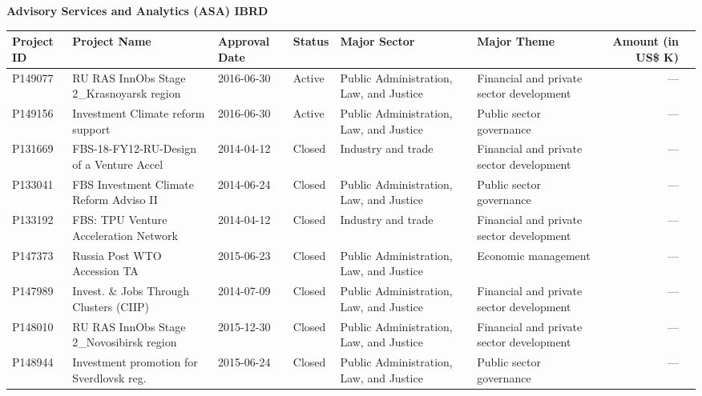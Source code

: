 \documentclass{article}\usepackage[]{graphicx}\usepackage[]{color}
\begin{document}
\begin{minipage}[b]{0.99\textwidth}
\begin{minipage}[b]{0.99\textwidth}
\begin{minipage}[c]{0.99\textwidth}
     \vspace*{0.5cm}
     \end{minipage}
     
     \begin{minipage}[c]{0.99\textwidth} %
     \raggedright{\color{white!30!blue} \textbf{\large Advisory Services and Analytics (ASA) IBRD}}
     \vspace*{0.5cm}
     
{\footnotesize
\begin{tabular}{l>{\raggedright}p{1in}ll>{\raggedright}p{1in}>{\raggedright}p{1in}rl}
 Project ID & Project Name & Approval Date & Status & Major Sector & Major Theme & Amount (in US\$ K) &  \\ 
  \hline
P149077 & RU RAS InnObs Stage 2\_Krasnoyarsk region & 2016-06-30 & Active & Public Administration, Law, and Justice & Financial and private sector development & --- &  \\ 
  P149156 & Investment Climate reform support & 2016-06-30 & Active & Public Administration, Law, and Justice & Public sector governance & --- &  \\ 
  P131669 & FBS-18-FY12-RU-Design of a Venture Accel & 2014-04-12 & Closed & Industry and trade & Financial and private sector development & --- &  \\ 
  P133041 & FBS Investment Climate Reform Adviso II & 2014-06-24 & Closed & Public Administration, Law, and Justice & Public sector governance & --- &  \\ 
  P133192 & FBS: TPU Venture Acceleration Network & 2014-04-12 & Closed & Industry and trade & Financial and private sector development & --- &  \\ 
  P147373 & Russia Post WTO Accession TA & 2015-06-23 & Closed & Public Administration, Law, and Justice & Economic management & --- &  \\ 
  P147989 & Invest. \& Jobs Through Clusters (CIIP) & 2014-07-09 & Closed & Public Administration, Law, and Justice & Financial and private sector development & --- &  \\ 
  P148010 & RU RAS InnObs Stage 2\_Novosibirsk region & 2015-12-30 & Closed & Public Administration, Law, and Justice & Financial and private sector development & --- &  \\ 
  P148944 & Investment promotion for Sverdlovsk reg. & 2015-06-24 & Closed & Public Administration, Law, and Justice & Public sector governance & --- &  \\ 

\end{tabular}}
\end{minipage}
\end{minipage}
\end{minipage}
\end{document}
